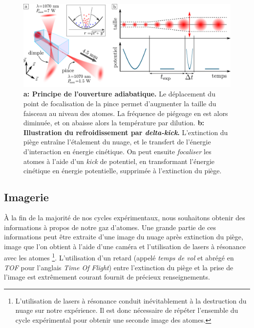 \begin{figure}
\centering
\includegraphics[width=\textwidth]{Fig/BEC_manip/adia_opening_and_delta_kick2.pdf}
\caption{\textbf{a: Principe de l'ouverture adiabatique.} Le déplacement du point de focalisation de la pince permet d'augmenter la taille du faisceau au niveau des atomes. La fréquence de piégeage en est alors diminuée, et on abaisse alors la température par dilution. \textbf{b: Illustration du refroidissement par \emph{delta-kick}.} L'extinction du piège entraîne l'étalement du nuage, et le transfert de l'énergie d'interaction en énergie cinétique. On peut ensuite \textit{focaliser} les atomes à l'aide d'un \textit{kick} de potentiel, en transformant l'énergie cinétique en énergie potentielle, supprimée à l'extinction du piège.}
\label{fig:adia_opening_and_delta_kick}
\end{figure}















\subsection{Imagerie}
\label{sc:imagerie}
À la fin de la majorité de nos cycles expérimentaux, nous souhaitons obtenir des informations à propos de notre gaz d'atomes. Une grande partie de ces informations peut être extraite d'une image du nuage après extinction du piège, image que l'on obtient à l'aide d'une caméra et l'utilisation de lasers à résonance avec les atomes \footnote{L'utilisation de lasers à résonance conduit inévitablement à la destruction du nuage sur notre expérience. Il est donc nécessaire de répéter l'ensemble du cycle expérimental pour obtenir une seconde image des atomes.}. L'utilisation d'un retard (appelé \emph{temps de vol} et abrégé en \emph{TOF} pour l'anglais \textit{Time Of Flight}) entre l'extinction du piège et la prise de l'image est extrêmement courant fournit de précieux renseignements.


